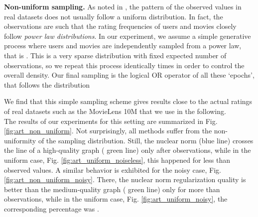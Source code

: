 \documentclass{article}
\begin{document}
{\bf Non-uniform sampling. } 
As noted in \cite{salakhutdinov2010collaborative}, the pattern of the observed values in real datasets does not usually follow a uniform distribution. In fact, the observations are such that the rating frequencies of users and movies closely follow \textit{power law distributions}. 
In our experiment, we assume a simple generative process where users and movies are independently sampled from a power law, that is . This is a very sparse distribution with fixed expected number of observations, so we repeat this process identically  times in order to control the overall density. Our final sampling is the logical OR operator of all these  `epochs', that follows the distribution

We find that this simple sampling scheme gives results close to the actual ratings of real datasets such as the MovieLens 10M that we use in the following.\\
The results of our experiments for this setting are summarized in Fig. \ref{fig:art_non_uniform}. Not surprisingly, all methods suffer from the non-uniformity of the sampling distribution. Still, the nuclear norm (blue line) crosses the line of a high-quality graph ( green line) only after  observations, while in the uniform case, Fig. \ref{fig:art_uniform_noiseless}, this happened for less than  observed values. A similar behavior is exhibited for the noisy case, Fig. \ref{fig:art_non_uniform_noisy}. There, the nuclear norm regularization quality is better than the medium-quality graph ( green line) only for more than  observations, while in the uniform case, Fig. \ref{fig:art_uniform_noisy}, the corresponding percentage was . 







































\vspace{-0.15cm}
\end{document}
